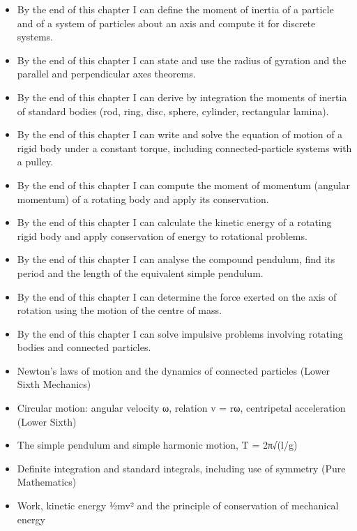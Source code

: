 \documentclass[11pt]{article}
\begin{document}
\begin{objectifs}
\begin{itemize}
\item By the end of this chapter I can define the moment of inertia of a particle and of a system of particles about an axis and compute it for discrete systems.
\item By the end of this chapter I can state and use the radius of gyration and the parallel and perpendicular axes theorems.
\item By the end of this chapter I can derive by integration the moments of inertia of standard bodies (rod, ring, disc, sphere, cylinder, rectangular lamina).
\item By the end of this chapter I can write and solve the equation of motion of a rigid body under a constant torque, including connected-particle systems with a pulley.
\item By the end of this chapter I can compute the moment of momentum (angular momentum) of a rotating body and apply its conservation.
\item By the end of this chapter I can calculate the kinetic energy of a rotating rigid body and apply conservation of energy to rotational problems.
\item By the end of this chapter I can analyse the compound pendulum, find its period and the length of the equivalent simple pendulum.
\item By the end of this chapter I can determine the force exerted on the axis of rotation using the motion of the centre of mass.
\item By the end of this chapter I can solve impulsive problems involving rotating bodies and connected particles.
\end{itemize}
\end{objectifs}

\begin{prerequis}
\begin{itemize}
\item Newton's laws of motion and the dynamics of connected particles (Lower Sixth Mechanics)
\item Circular motion: angular velocity ω, relation v = rω, centripetal acceleration (Lower Sixth)
\item The simple pendulum and simple harmonic motion, T = 2π√(l/g)
\item Definite integration and standard integrals, including use of symmetry (Pure Mathematics)
\item Work, kinetic energy ½mv² and the principle of conservation of mechanical energy
\end{itemize}
\end{prerequis}
\end{document}
